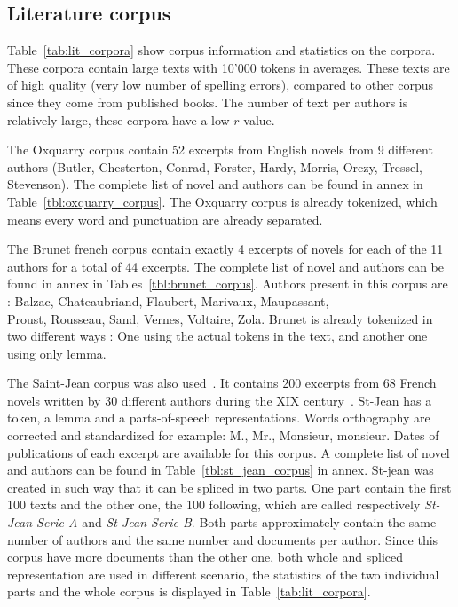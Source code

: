 \subsection{Literature corpus \label{sec:lit_corpus}}

Table~\ref{tab:lit_corpora} show corpus information and statistics on the corpora.
These corpora contain large texts with 10'000 tokens in averages.
These texts are of high quality (very low number of spelling errors), compared to other corpus since they come from published books.
The number of text per authors is relatively large, these corpora have a low $r$ value.

The Oxquarry corpus contain 52 excerpts from English novels from 9 different authors (Butler, Chesterton, Conrad, Forster, Hardy, Morris, Orczy, Tressel, Stevenson).
The complete list of novel and authors can be found in annex in Table~\ref{tbl:oxquarry_corpus}.
The Oxquarry corpus is already tokenized, which means every word and punctuation are already separated.

The Brunet french corpus contain exactly 4 excerpts of novels for each of the 11 authors for a total of 44 excerpts.
The complete list of novel and authors can be found in annex in Tables~\ref{tbl:brunet_corpus}.
Authors present in this corpus are : Balzac, Chateaubriand, Flaubert, Marivaux, Maupassant, \\
Proust, Rousseau, Sand, Vernes, Voltaire, Zola.
Brunet is already tokenized in two different ways : One using the actual tokens in the text, and another one using only lemma.

The Saint-Jean corpus was also used~\cite{unine_corpus}.
It contains 200 excerpts from 68 French novels written by 30 different authors during the XIX century~\cite{st_jean}.
St-Jean has a token, a lemma and a parts-of-speech representations.
Words orthography are corrected and standardized for example: M., Mr., Monsieur, monsieur.
Dates of publications of each excerpt are available for this corpus.
A complete list of novel and authors can be found in Table~\ref{tbl:st_jean_corpus} in annex.
St-jean was created in such way that it can be spliced in two parts.
One part contain the first 100 texts and the other one, the 100 following, which are called respectively \textit{St-Jean Serie A} and \textit{St-Jean Serie B}.
Both parts approximately contain the same number of authors and the same number and documents per author.
Since this corpus have more documents than the other one, both whole and spliced representation are used in different scenario, the statistics of the two individual parts and the whole corpus is displayed in Table~\ref{tab:lit_corpora}.

